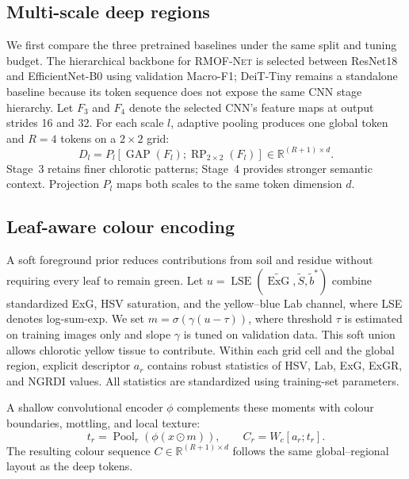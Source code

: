 \documentclass[conference]{IEEEtran}
\newcommand{\rmofnet}{\textsc{RMOF-Net}\xspace}
\begin{document}
\subsection{Multi-scale deep regions}
We first compare the three pretrained baselines under the same split and tuning budget. The hierarchical backbone for \rmofnet is selected between ResNet18 and EfficientNet-B0 using validation Macro-F1; DeiT-Tiny remains a standalone baseline because its token sequence does not expose the same CNN stage hierarchy. Let $F_3$ and $F_4$ denote the selected CNN's feature maps at output strides 16 and 32. For each scale $l$, adaptive pooling produces one global token and $R=4$ tokens on a $2\times2$ grid:
\begin{equation}
D_l=P_l[\operatorname{GAP}(F_l);\operatorname{RP}_{2\times2}(F_l)]
\in\mathbb{R}^{(R+1)\times d}.
\label{eq:deep-tokens}
\end{equation}
Stage~3 retains finer chlorotic patterns; Stage~4 provides stronger semantic context. Projection $P_l$ maps both scales to the same token dimension $d$.

\subsection{Leaf-aware colour encoding}
A soft foreground prior reduces contributions from soil and residue without requiring every leaf to remain green. Let $u=\operatorname{LSE}(\widetilde{\operatorname{ExG}},\widetilde S,\widetilde b^{*})$ combine standardized ExG, HSV saturation, and the yellow--blue Lab channel, where LSE denotes log-sum-exp. We set $m=\sigma(\gamma(u-\tau))$, where threshold $\tau$ is estimated on training images only and slope $\gamma$ is tuned on validation data. This soft union allows chlorotic yellow tissue to contribute. Within each grid cell and the global region, explicit descriptor $a_r$ contains robust statistics of HSV, Lab, ExG, ExGR, and NGRDI values. All statistics are standardized using training-set parameters.

A shallow convolutional encoder $\phi$ complements these moments with colour boundaries, mottling, and local texture:
\begin{equation}
t_r=\operatorname{Pool}_{r}(\phi(x\odot m)),\qquad
C_r=W_c[a_r;t_r].
\label{eq:colour-tokens}
\end{equation}
The resulting colour sequence $C\in\mathbb{R}^{(R+1)\times d}$ follows the same global--regional layout as the deep tokens.
\end{document}
